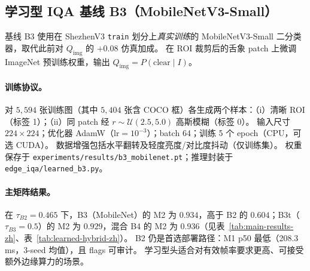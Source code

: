 \subsection{学习型 IQA 基线 B3（MobileNetV3-Small）}
\label{sec:b3-learned-zh}

基线 B3 使用在 ShezhenV3 \texttt{train} 划分上\emph{真实训练}的 MobileNetV3-Small 二分类器，取代此前对 $Q_{\mathrm{img}}$ 的 $+0.08$ 仿真加成。
在 ROI 裁剪后的舌象 patch 上微调 ImageNet 预训练权重，输出 $Q_{\mathrm{img}} = P(\mathrm{clear}\mid I)$。

\paragraph{训练协议。}
对 $5{,}594$ 张训练图（其中 $5{,}404$ 张含 COCO 框）各生成两个样本：（i）清晰 ROI（标签 1）；（ii）同 patch 经 $r{\sim}\mathcal{U}(2.5,5.0)$ 高斯模糊（标签 0）。
输入尺寸 $224{\times}224$；优化器 AdamW（$\mathrm{lr}{=}10^{-3}$）；batch 64；训练 5 个 epoch（CPU，可选 CUDA）。
数据增强包括水平翻转及轻度亮度/对比度抖动（仅训练集）。
权重保存于 \texttt{experiments/results/b3\_mobilenet.pt}；推理封装于 \texttt{edge\_iqa/learned\_b3.py}。

\paragraph{主矩阵结果。}
在 $\tau_{B2}{=}0.465$ 下，B3（MobileNet）的 M2 为 $0.934$，高于 B2 的 $0.604$；B3t（$\tau_{B3}{=}0.5$）的 M2 为 $0.929$，混合 B4 的 M2 为 $0.936$（见表~\ref{tab:main-results-zh}、表~\ref{tab:learned-hybrid-zh}）。
B2 仍是首选部署路径：M1 p50 最低（208.3\,ms，3-seed 均值），且 flags 可审计。
学习型头适合对有效帧率要求更高、可接受额外边缘算力的场景。
